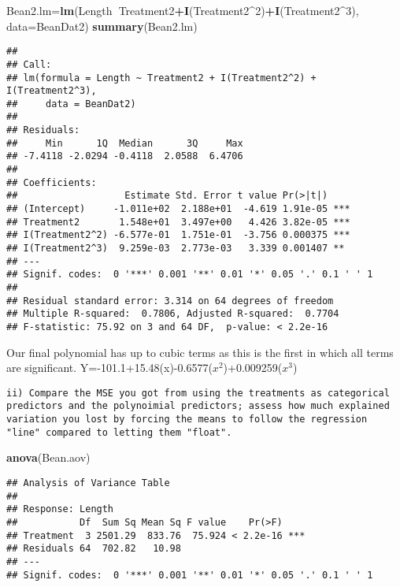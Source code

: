 \documentclass[]{article}
\newenvironment{Shaded}{\begin{snugshade}}{\end{snugshade}}
\newcommand{\KeywordTok}[1]{\textcolor[rgb]{0.13,0.29,0.53}{\textbf{#1}}}
\newcommand{\DataTypeTok}[1]{\textcolor[rgb]{0.13,0.29,0.53}{#1}}
\newcommand{\DecValTok}[1]{\textcolor[rgb]{0.00,0.00,0.81}{#1}}
\newcommand{\OperatorTok}[1]{\textcolor[rgb]{0.81,0.36,0.00}{\textbf{#1}}}
\newcommand{\NormalTok}[1]{#1}
\begin{document}
\begin{Shaded}
\begin{Highlighting}[]
\NormalTok{Bean2.lm=}\KeywordTok{lm}\NormalTok{(Length}\OperatorTok{~}\NormalTok{Treatment2}\OperatorTok{+}\KeywordTok{I}\NormalTok{(Treatment2}\OperatorTok{^}\DecValTok{2}\NormalTok{)}\OperatorTok{+}\KeywordTok{I}\NormalTok{(Treatment2}\OperatorTok{^}\DecValTok{3}\NormalTok{), }\DataTypeTok{data=}\NormalTok{BeanDat2)}
\KeywordTok{summary}\NormalTok{(Bean2.lm)}
\end{Highlighting}
\end{Shaded}

\begin{verbatim}
## 
## Call:
## lm(formula = Length ~ Treatment2 + I(Treatment2^2) + I(Treatment2^3), 
##     data = BeanDat2)
## 
## Residuals:
##     Min      1Q  Median      3Q     Max 
## -7.4118 -2.0294 -0.4118  2.0588  6.4706 
## 
## Coefficients:
##                   Estimate Std. Error t value Pr(>|t|)    
## (Intercept)     -1.011e+02  2.188e+01  -4.619 1.91e-05 ***
## Treatment2       1.548e+01  3.497e+00   4.426 3.82e-05 ***
## I(Treatment2^2) -6.577e-01  1.751e-01  -3.756 0.000375 ***
## I(Treatment2^3)  9.259e-03  2.773e-03   3.339 0.001407 ** 
## ---
## Signif. codes:  0 '***' 0.001 '**' 0.01 '*' 0.05 '.' 0.1 ' ' 1
## 
## Residual standard error: 3.314 on 64 degrees of freedom
## Multiple R-squared:  0.7806, Adjusted R-squared:  0.7704 
## F-statistic: 75.92 on 3 and 64 DF,  p-value: < 2.2e-16
\end{verbatim}

Our final polynomial has up to cubic terms as this is the first in which
all terms are significant.
Y=-101.1+15.48(x)-0.6577(\(x^2\))+0.009259(\(x^3\))

\begin{verbatim}
ii) Compare the MSE you got from using the treatments as categorical predictors and the polynoimial predictors; assess how much explained variation you lost by forcing the means to follow the regression "line" compared to letting them "float". 
\end{verbatim}

\begin{Shaded}
\begin{Highlighting}[]
\KeywordTok{anova}\NormalTok{(Bean.aov)}
\end{Highlighting}
\end{Shaded}

\begin{verbatim}
## Analysis of Variance Table
## 
## Response: Length
##           Df  Sum Sq Mean Sq F value    Pr(>F)    
## Treatment  3 2501.29  833.76  75.924 < 2.2e-16 ***
## Residuals 64  702.82   10.98                      
## ---
## Signif. codes:  0 '***' 0.001 '**' 0.01 '*' 0.05 '.' 0.1 ' ' 1
\end{verbatim}
\end{document}
